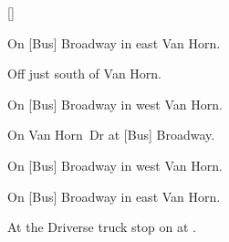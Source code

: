 
[]

\begin{LocationList}

On [Bus] Broadway in east Van Horn.

Off  just south of Van Horn.

On [Bus] Broadway in west Van Horn.

On  Van Horn~Dr at [Bus] Broadway.

On [Bus] Broadway in west Van Horn.

\Location{\TruckService \Service}
On [Bus] Broadway in east Van Horn.

At the Driverse truck stop on  at .

\end{LocationList}
